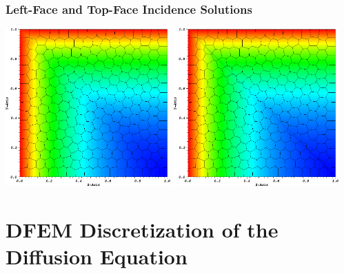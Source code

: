 \documentclass[compress,10pt]{beamer}
\begin{document}
\begin{frame}[t]
{}
{
\frametitle{Left-Face and Top-Face Incidence Solutions}
\vspace{0.75cm}
\hspace*{0.25cm}
{}\includegraphics[width=0.475\textwidth]{images/PALeftTopSol_Poly.png} 
{}\includegraphics[width=0.475\textwidth]{images/PALeftTopSol_SplitPoly.png}
}
\end{frame}
\typeout{***********************************************************************************}
\section[MIP Form]{DFEM Discretization of the Diffusion Equation}
\end{document}

